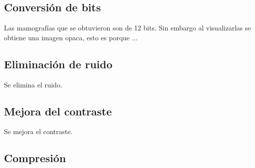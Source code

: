 \subsection{Conversión de bits}
Las mamografías que se obtuvieron son de 12 bits. Sin embargo al visualizarlas
se obtiene una imagen opaca, esto es porque ...

\subsection{Eliminación de ruido}
Se elimina el ruido.

\subsection{Mejora del contraste}
Se mejora el contraste.

\subsection{Compresión} \label{compression}

